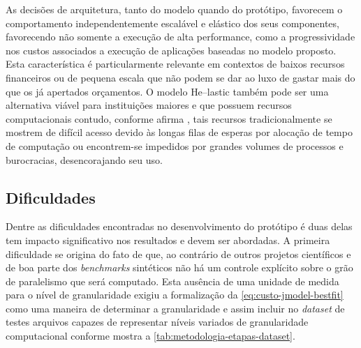 \documentclass[english,brazilian]{UNISINOSmonografia} %
\begin{document}
As decisões de arquitetura, tanto do modelo quando do protótipo, favorecem o comportamento independentemente escalável e elástico dos seus componentes, favorecendo não somente a execução de alta performance, como a progressividade nos custos associados a execução de aplicações baseadas no modelo proposto.
%
Esta característica é particularmente relevante em contextos de baixos recursos financeiros ou de pequena escala que não podem se dar ao luxo de gastar mais do que os já apertados orçamentos.
%
O modelo \textsf{He}--lastic também pode ser uma alternativa viável para instituições maiores e que possuem recursos computacionais contudo, conforme afirma , tais recursos tradicionalmente se mostrem de difícil acesso devido às longas filas de esperas por alocação de tempo de computação ou encontrem-se impedidos por grandes volumes de processos e burocracias, desencorajando seu uso.



\subsection{Dificuldades}
\label{sec:metodologia-prototipo-dificuldades}
Dentre as dificuldades encontradas no desenvolvimento do protótipo é duas delas tem impacto significativo nos resultados e devem ser abordadas.
%
A primeira dificuldade se origina do fato de que, ao contrário de outros projetos científicos e de boa parte dos \textit{benchmarks} sintéticos não há um controle explícito sobre o grão de paralelismo que será computado.
%
Esta ausência de uma unidade de medida para o nível de granularidade exigiu a formalização da \autoref{eq:custo-jmodel-bestfit} como uma maneira de determinar a granularidade e assim incluir no \textit{dataset} de testes arquivos capazes de representar níveis variados de granularidade computacional conforme mostra a \autoref{tab:metodologia-etapas-dataset}.
\end{document}
